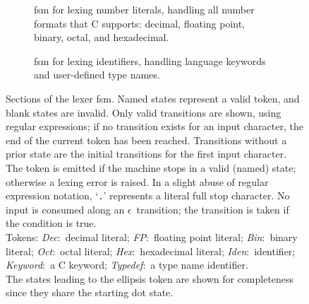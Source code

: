 \documentclass[00-main.tex]{subfiles}
\begin{document}
\begin{figure}[p]
  \hspace{2ex}
  \begin{subfigure}[t]{\textwidth-4ex}
    \centering
    \caption{\Gls{fsm} for lexing number literals, handling all number formats that C supports: decimal, floating point, binary, octal, and hexadecimal.}%
    \label{subfig:lexer fsm numbers}
  \end{subfigure}
  \par\vspace{2\bigskipamount}
  \begin{subfigure}[t]{\textwidth}
    \centering
    \caption{\Gls{fsm} for lexing identifiers, handling language keywords and user-defined type names.}%
    \label{subfig:lexer fsm identifiers}
  \end{subfigure}
  \caption{
    \protect{}Sections of the lexer \gls{fsm}.
    Named states represent a valid token, and blank states are invalid.
    Only valid transitions are shown, using regular expressions; if no transition exists for an input character, the end of the current token has been reached.
    Transitions without a prior state are the initial transitions for the first input character.
    The token is emitted if the machine stops in a valid (named) state; otherwise a lexing error is raised.
    In a slight abuse of regular expression notation, `\texttt{.}' represents a literal full stop character.
    No input is consumed along an $\epsilon$~transition; the transition is taken if the condition is true. \\
    Tokens: \emph{Dec}:~decimal literal; \emph{FP}:~floating point literal; \emph{Bin}:~binary literal; \emph{Oct}:~octal literal; \emph{Hex}:~hexadecimal literal; \emph{Iden}:~identifier; \emph{Keyword}:~a C keyword; \emph{Typedef}\!:~a type name identifier. \\
    The states leading to the ellipsis token are shown for completeness since they share the starting dot state.
  }%
  \label{fig:lexer fsm}
\end{figure}
\end{document}
